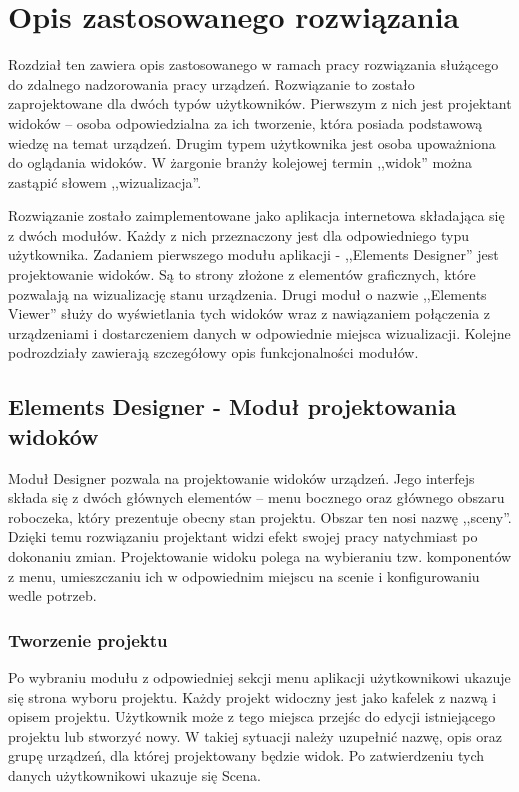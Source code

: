 \chapter{Opis zastosowanego rozwiązania}

Rozdział ten zawiera opis zastosowanego w ramach pracy rozwiązania służącego do zdalnego nadzorowania pracy urządzeń. Rozwiązanie to zostało zaprojektowane dla dwóch typów użytkowników. Pierwszym z nich jest projektant widoków – osoba odpowiedzialna za ich tworzenie, która posiada podstawową wiedzę na temat urządzeń. Drugim typem użytkownika jest osoba upoważniona do oglądania widoków. W żargonie branży kolejowej termin ,,widok'' można zastąpić słowem ,,wizualizacja''.

Rozwiązanie zostało zaimplementowane jako aplikacja internetowa składająca się z dwóch modułów. Każdy z nich przeznaczony jest dla odpowiedniego typu użytkownika. Zadaniem pierwszego modułu aplikacji - ,,Elements Designer'' jest projektowanie widoków. Są to strony złożone z elementów graficznych, które pozwalają na wizualizację stanu urządzenia. Drugi moduł o nazwie ,,Elements Viewer'' służy do wyświetlania tych widoków wraz z nawiązaniem połączenia z urządzeniami i dostarczeniem danych w odpowiednie miejsca wizualizacji. Kolejne podrozdziały zawierają szczegółowy opis funkcjonalności modułów.

\section{Elements Designer - Moduł projektowania widoków}

Moduł Designer pozwala na projektowanie widoków urządzeń. Jego interfejs składa się z dwóch głównych elementów – menu bocznego oraz głównego obszaru roboczeka, który prezentuje obecny stan projektu. Obszar ten nosi nazwę ,,sceny''. Dzięki temu rozwiązaniu projektant widzi efekt swojej pracy natychmiast po dokonaniu zmian.
Projektowanie widoku polega na wybieraniu tzw. komponentów z menu, umieszczaniu ich w odpowiednim miejscu na scenie i konfigurowaniu wedle potrzeb.

\subsection{Tworzenie projektu}

Po wybraniu modułu z odpowiedniej sekcji menu aplikacji użytkownikowi ukazuje się strona wyboru projektu. Każdy projekt widoczny jest jako kafelek z nazwą i opisem projektu. Użytkownik może z tego miejsca przejśc do edycji istniejącego projektu lub stworzyć nowy. W takiej sytuacji należy uzupełnić nazwę, opis oraz grupę urządzeń, dla której projektowany będzie widok. Po zatwierdzeniu tych danych użytkownikowi ukazuje się Scena.


